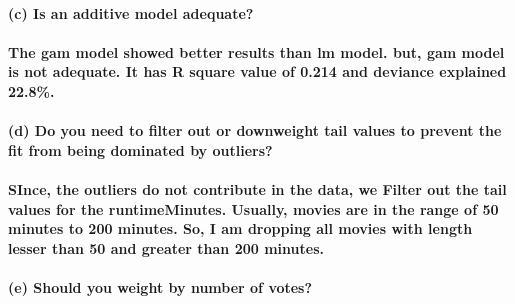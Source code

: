 \documentclass[
]{article}
\begin{document}
\hypertarget{c-is-an-additive-model-adequate}{%
\paragraph{(c) Is an additive model
adequate?}\label{c-is-an-additive-model-adequate}}

\hypertarget{the-gam-model-showed-better-results-than-lm-model.-but-gam-model-is-not-adequate.-it-has-r-square-value-of-0.214-and-deviance-explained-22.8.}{%
\paragraph{The gam model showed better results than lm model. but, gam
model is not adequate. It has R square value of 0.214 and deviance
explained
22.8\%.}\label{the-gam-model-showed-better-results-than-lm-model.-but-gam-model-is-not-adequate.-it-has-r-square-value-of-0.214-and-deviance-explained-22.8.}}

\hypertarget{d-do-you-need-to-filter-out-or-downweight-tail-values-to-prevent-the-fit-from-being-dominated-by-outliers}{%
\paragraph{(d) Do you need to filter out or downweight tail values to
prevent the fit from being dominated by
outliers?}\label{d-do-you-need-to-filter-out-or-downweight-tail-values-to-prevent-the-fit-from-being-dominated-by-outliers}}

\hypertarget{since-the-outliers-do-not-contribute-in-the-data-we-filter-out-the-tail-values-for-the-runtimeminutes.-usually-movies-are-in-the-range-of-50-minutes-to-200-minutes.-so-i-am-dropping-all-movies-with-length-lesser-than-50-and-greater-than-200-minutes.}{%
\paragraph{SInce, the outliers do not contribute in the data, we Filter
out the tail values for the runtimeMinutes. Usually, movies are in the
range of 50 minutes to 200 minutes. So, I am dropping all movies with
length lesser than 50 and greater than 200
minutes.}\label{since-the-outliers-do-not-contribute-in-the-data-we-filter-out-the-tail-values-for-the-runtimeminutes.-usually-movies-are-in-the-range-of-50-minutes-to-200-minutes.-so-i-am-dropping-all-movies-with-length-lesser-than-50-and-greater-than-200-minutes.}}

\hypertarget{e-should-you-weight-by-number-of-votes}{%
\paragraph{(e) Should you weight by number of
votes?}\label{e-should-you-weight-by-number-of-votes}}
\end{document}
